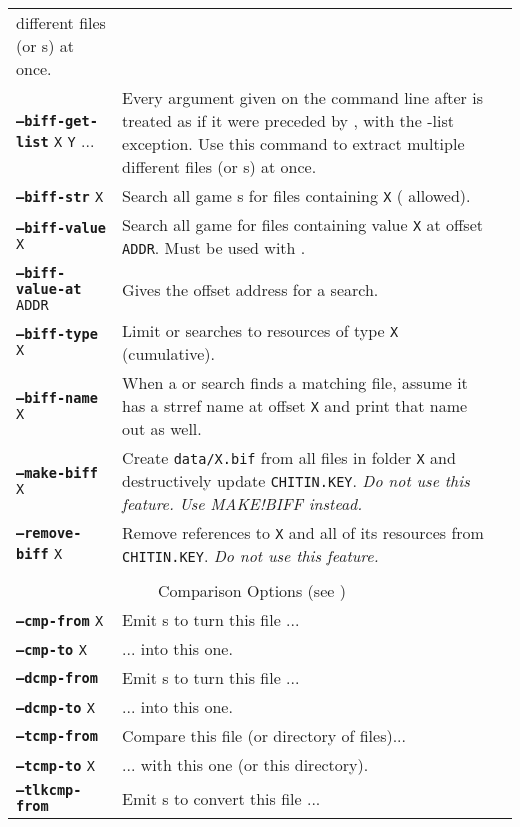 \documentclass{article}
\def\ttref#1{\ahrefloc{#1}{\tt #1}}
\def\DEFINE#1{{\tt \bf #1}\label{#1}\index{#1}}
\def\t#1{{\tt #1}}
\begin{document}
\begin{tabular}{lp{10in}|p{10in}}
different files (or \ttref{regexp}s) at once. \\
\DEFINE{--biff-get-list} \t{X} \t{Y} ... & Every argument given on the
command line after \ttref{--biff-get-rest} is treated as if it were
preceded by \ttref{--biff-get}, with the -list exception. Use this command to extract multiple
different files (or \ttref{regexp}s) at once. \\
\DEFINE{--biff-str} \t{X}&	Search all game \ttref{BIFF}s for files
containing \t{X} (\ttref{regexp} allowed). \\
\DEFINE{--biff-value} \t{X} &   Search all game \ttref{BIFFs} for files
containing value \t{X} at offset \t{ADDR}. Must be used with
\ttref{--biff-value-at}. \\
\DEFINE{--biff-value-at} \t{ADDR} & Gives the offset address for a
\ttref{--biff-value} search. \\
\DEFINE{--biff-type} \t{X}&	Limit \ttref{--biff-str} or
\ttref{--biff-value} searches to
resources of type \t{X} (cumulative). \\
\DEFINE{--biff-name} \t{X}&	When a \ttref{--biff-str} or
\ttref{--biff-value} search finds a
matching file, assume it has a strref name at offset \t{X} and print that
name out as well. \\
\DEFINE{--make-biff} \t{X} & Create \t{data/X.bif} from all files in
folder \t{X} and destructively update \t{CHITIN.KEY}. \emph{Do not use this
feature. Use MAKE!BIFF instead.} \\
\DEFINE{--remove-biff} \t{X} & Remove references to \ttref{BIFF} \t{X} and
all of its resources from \t{CHITIN.KEY}. \emph{Do not use this feature.} \\
\\
\multicolumn{2}{c}{ {\color{red} Comparison Options} (see \ttref{--out})} \\
\DEFINE{--cmp-from} \t{X}&	Emit \ttref{WRITE!BYTE}s to turn this file ... \\
\DEFINE{--cmp-to}   \t{X}&	... into this one. \\
\DEFINE{--dcmp-from}\t{X}&	Emit \ttref{REPLACE}s to turn this \ttref{DLG} file ... \\
\DEFINE{--dcmp-to}  \t{X}&	... into this one. \\
\DEFINE{--tcmp-from}\t{X}&	Compare this \ttref{TRA} file (or directory of \ttref{TRA }files)... \\
\DEFINE{--tcmp-to}  \t{X}&	... with this one (or this directory). \\
\DEFINE{--tlkcmp-from}\t{X}&	Emit \ttref{STRING!SET}s to convert this \ttref{TLK} file ... \\

\end{tabular}
\end{document}
